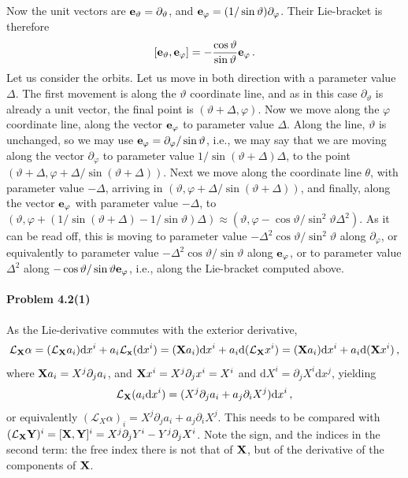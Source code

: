 \documentclass[a4paper,12pt]{article}
\def\d{\mathrm{d}}
\newcommand{\problem}[1]{\paragraph{Problem #1}}
\begin{document}
Now the unit vectors are ${\bf e}_\vartheta = \partial_\vartheta$, and ${\bf e}_\varphi = (1/\sin\vartheta)\partial_\varphi$. Their Lie-bracket is therefore
\[
 [{\bf e}_\vartheta, {\bf e}_\varphi] = -\frac{\cos\vartheta}{\sin\vartheta} {\bf e}_\varphi\,.
\]
Let us consider the orbits. Let us move in both direction with a parameter value $\Delta$. The first movement is along the $\vartheta$ coordinate line, and as in this case $\partial_\vartheta$ is already a unit vector, the final point is $(\vartheta + \Delta, \varphi)$. Now we move along the $\varphi$ coordinate line, along the vector ${\bf e}_\varphi$ to parameter value $\Delta$. Along the line, $\vartheta$ is unchanged, so we may use ${\bf e}_\varphi = \partial_\varphi/\sin\vartheta$, i.e., we may say that we are moving along the vector $\partial_\varphi$ to parameter value $1/\sin(\vartheta + \Delta)\Delta$, to the point $(\vartheta + \Delta, \varphi + \Delta/\sin(\vartheta+\Delta))$. Next we move along the coordinate line $\theta$, with parameter value $-\Delta$, arriving in $(\vartheta, \varphi + \Delta/\sin(\vartheta+\Delta))$, and finally, along the vector ${\bf e}_\varphi$ with parameter value $-\Delta$, to $(\vartheta, \varphi + (1/\sin(\vartheta + \Delta) - 1/\sin\vartheta)\Delta)\approx (\vartheta, \varphi - \cos\vartheta/\sin^2\vartheta \Delta^2)$. As it can be read off, this is moving to parameter value $-\Delta^2\cos\vartheta/\sin^2\vartheta$ along $\partial_\varphi$, or equivalently to parameter value $-\Delta^2 \cos\vartheta/\sin\vartheta$ along ${\bf e}_\varphi$, or to parameter value $\Delta^2$ along $-\cos\vartheta/\sin\vartheta {\bf e}_{\varphi}$, i.e., along the Lie-bracket computed above.


\problem{4.2(1)} As the Lie-derivative commutes with the exterior derivative,
\[
 \mathcal{L}_{\bf X}\alpha = (\mathcal{L}_{\bf X} a_i) \d x^i + a_i \mathcal{L}_{\bf x}(\d x^i) = ({\bf X}a_i) \d x^i + a_i \d (\mathcal{L}_{\bf X}x^i) = ({\bf X}a_i) \d x^i + a_i \d ({\bf X}x^i)\,,
\]
where ${\bf X}a_i = X^j \partial_j a_i$, and ${\bf X}x^i = X^j \partial_j x^i = X^i$ and $\d X^i = \partial_j X^i \d x^j$, yielding
\[
 \mathcal{L}_{\bf X}(a_i \d x^i)=(X^j \partial_j a_i + a_j \partial_i X^j )\d x^i\,,
\]
or equivalently $(\mathcal{L}_{X}\alpha)_i = X^j \partial_j a_i + a_j \partial_i X^j$.
This needs to be compared with $(\mathcal{L}_{\bf X}{\bf Y})^i = [{\bf X}, {\bf Y}]^i = X^j \partial_j Y^i - Y^j \partial_j X^i$. Note the sign, and the indices in the second term: the free index there is not that of ${\bf X}$, but of the derivative of the components of ${\bf X}$.
\end{document}
